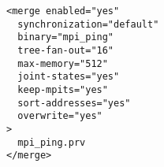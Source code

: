\begin{verbatim}
<merge enabled="yes" 
  synchronization="default"
  binary="mpi_ping"
  tree-fan-out="16"
  max-memory="512"
  joint-states="yes"
  keep-mpits="yes"
  sort-addresses="yes"
  overwrite="yes"
>
  mpi_ping.prv 
</merge>
\end{verbatim}
